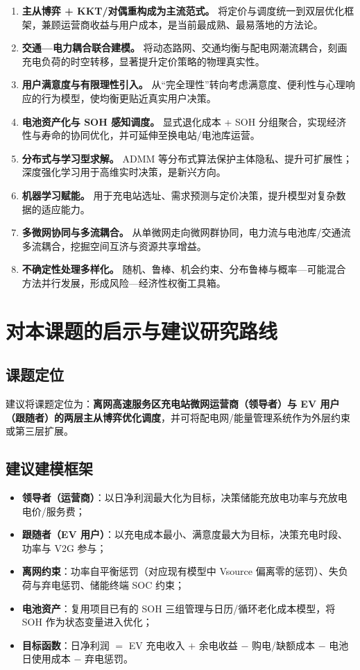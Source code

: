 \documentclass[UTF8,a4paper,11pt]{ctexart}
\begin{document}
\begin{enumerate}
  \item \textbf{主从博弈 + KKT/对偶重构成为主流范式。} 将定价与调度统一到双层优化框架，兼顾运营商收益与用户成本，是当前最成熟、最易落地的方法论\cite{ref1,ref2,ref3,ref6}。
  \item \textbf{交通—电力耦合联合建模。} 将动态路网、交通均衡与配电网潮流耦合，刻画充电负荷的时空转移，显著提升定价策略的物理真实性\cite{ref4,ref14}。
  \item \textbf{用户满意度与有限理性引入。} 从“完全理性”转向考虑满意度、便利性与心理响应的行为模型，使均衡更贴近真实用户决策\cite{ref2,ref9}。
  \item \textbf{电池资产化与 SOH 感知调度。} 显式退化成本 + SOH 分组聚合，实现经济性与寿命的协同优化，并可延伸至换电站/电池库运营\cite{ref7,ref8,ref13}。
  \item \textbf{分布式与学习型求解。} ADMM 等分布式算法保护主体隐私、提升可扩展性；深度强化学习用于高维实时决策，是新兴方向\cite{ref7,ref15}。
  \item \textbf{机器学习赋能。} 用于充电站选址、需求预测与定价决策，提升模型对复杂数据的适应能力\cite{ref5,ref15}。
  \item \textbf{多微网协同与多流耦合。} 从单微网走向微网群协同，电力流与电池库/交通流多流耦合，挖掘空间互济与资源共享增益\cite{ref12}。
  \item \textbf{不确定性处理多样化。} 随机、鲁棒、机会约束、分布鲁棒与概率—可能混合方法并行发展，形成风险—经济性权衡工具箱\cite{ref7,ref13}。
\end{enumerate}

\section{对本课题的启示与建议研究路线}

\subsection{课题定位}
建议将课题定位为：\textbf{离网高速服务区充电站微网运营商（领导者）与 EV 用户（跟随者）的两层主从博弈优化调度}，并可将配电网/能量管理系统作为外层约束或第三层扩展。

\subsection{建议建模框架}
\begin{itemize}
  \item \textbf{领导者（运营商）}：以日净利润最大化为目标，决策储能充放电功率与充放电电价/服务费；
  \item \textbf{跟随者（EV 用户）}：以充电成本最小、满意度最大为目标，决策充电时段、功率与 V2G 参与；
  \item \textbf{离网约束}：功率自平衡惩罚（对应现有模型中 Vsource 偏离零的惩罚）、失负荷与弃电惩罚、储能终端 SOC 约束；
  \item \textbf{电池资产}：复用项目已有的 SOH 三组管理与日历/循环老化成本模型，将 SOH 作为状态变量进入优化；
  \item \textbf{目标函数}：日净利润 $=$ EV 充电收入 $+$ 余电收益 $-$ 购电/缺额成本 $-$ 电池日使用成本 $-$ 弃电惩罚。
\end{itemize}
\end{document}
